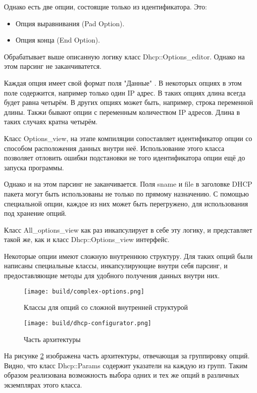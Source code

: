 \documentclass[14pt,a4paper]{extarticle}
\begin{document}
Однако есть две опции, состоящие только из идентификатора. Это:
\begin{itemize}
    \item Опция выравнивания (Pad Option).
    \item Опция конца (End Option).
\end{itemize}

Обрабатывает выше описанную логику класс Dhcp::Options\_editor. Однако на этом парсинг не заканчиватется.

Каждая опция имеет свой формат поля "Данные" \cite{rfc2132}. В некоторых опциях в этом поле содержится, например только один IP адрес. В таких опциях длина всегда будет равна четырём. В других опциях может быть, например, строка переменной длины. Такжи бывают опции с переменным количеством IP адресов. Длина в таких случаях кратна четырём.

Класс Options\_view, на этапе компиляции сопоставляет идентификатор опции со способом расположения данных внутри неё. Использование этого класса позволяет отловить ошибки подстановки не того идентификатора опции ещё до запуска программы.

Однако и на этом парсинг не заканчивается.
Поля sname и file в заголовке DHCP пакета могут быть использованы не только по прямому назначению. С помощью специальной опции, каждое из них может быть перегружено, для использования под хранение опций.

Класс All\_options\_view как раз инкапсулирует в себе эту логику, и представляет такой же, как и класс Dhcp::Options\_view интерфейс.

Некоторые опции имеют сложную внутреннюю структуру. Для таких опций были написаны специальные классы, инкапсулирующие внутри себя парсинг, и предоставляющие методы для удобного получения данных внутри них.

\begin{figure}[H]
    \centering
    \texttt{[image: build/complex-options.png]}
    \caption{Классы для опций со сложной внутренней структурой}
    \label{fig:complex_options}
\end{figure}

\begin{figure}[H]
    \texttt{[image: build/dhcp-configurator.png]}
    \caption{Часть архитектуры}
    \label{fig:profiles}
\end{figure}

На рисунке \ref{fig:profiles} изображена часть архитектуры, отвечающая за группировку опций.
Видно, что класс Dhcp::Params содержит указатели на каждую из групп. Таким образом реализована возможность выбора одних и тех же опций в различных экземплярах этого класса.
\end{document}
